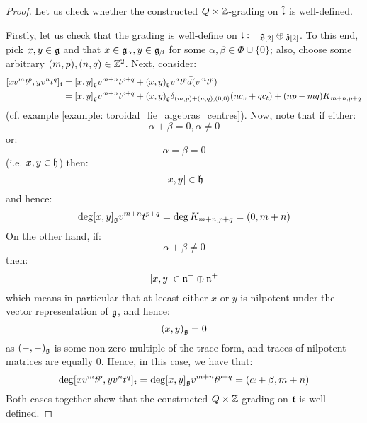             \begin{proof}
                Let us check whether the constructed $Q \x \Z$-grading on $\hat{\mathfrak{t}}$ is well-defined.
    
                Firstly, let us check that the grading is well-define on $\mathfrak{t} := \mathfrak{g}_{[2]} \oplus \mathfrak{z}_{[2]}$. To this end, pick $x, y \in \mathfrak{g}$ and that $x \in \mathfrak{g}_{\alpha}, y \in \mathfrak{g}_{\beta}$ for some $\alpha, \beta \in \Phi \cup \{0\}$; also, choose some arbitrary $(m, p), (n, q) \in \mathbb{Z}^2$. Next, consider:
                    $$
                        \begin{aligned}
                            [x v^m t^p, y v^n t^q]_{\toroidal} & = [x, y]_{\g} v^{m + n} t^{p + q} + (x, y)_{\g} v^n t^p \bar{d}(v^m t^p)
                            \\
                            & = [x, y]_{\g} v^{m + n} t^{p + q} + (x, y)_{\g} \delta_{(m, p) + (n, q), (0, 0)} ( n c_v + q c_t ) + (np - mq) K_{m + n, p + q}
                        \end{aligned}
                    $$
                (cf. example \ref{example: toroidal_lie_algebras_centres}). Now, note that if either:
                    $$\alpha + \beta = 0, \alpha \not = 0$$
                or:
                    $$\alpha = \beta = 0$$
                (i.e. $x, y \in \mathfrak{h}$) then:
                    $$[x, y] \in \mathfrak{h}$$
                and hence:
                    $$\deg [x, y]_{\mathfrak{g}} v^{m + n} t^{p + q} = \deg K_{m + n, p + q} = (0, m + n)$$
                On the other hand, if:
                    $$\alpha + \beta \not = 0$$
                then:
                    $$[x, y] \in \mathfrak{n}^- \oplus \mathfrak{n}^+$$
                which means in particular that at leeast either $x$ or $y$ is nilpotent under the vector representation of $\mathfrak{g}$, and hence:
                    $$(x, y)_{\mathfrak{g}} = 0$$
                as $(-, -)_{\mathfrak{g}}$ is some non-zero multiple of the trace form, and traces of nilpotent matrices are equally $0$. Hence, in this case, we have that:
                    $$\deg [x v^m t^p, y v^n t^q]_{\mathfrak{t}} = \deg [x, y]_{\mathfrak{g}} v^{m + n} t^{p + q} = (\alpha + \beta, m + n)$$
                Both cases together show that the constructed $Q \x \Z$-grading on $\mathfrak{t}$ is well-defined. 
                

\end{proof}
